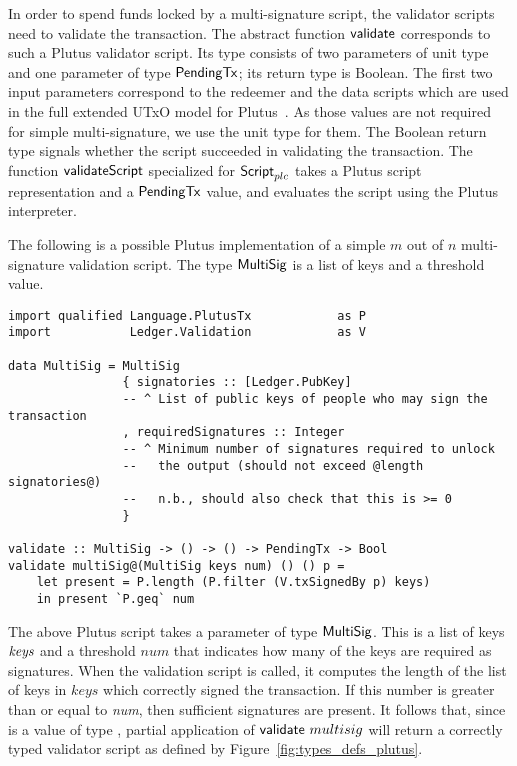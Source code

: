 \documentclass[11pt,a4paper,dvipsnames,twosided]{article}
\newcommand{\Script}{\type{Script}}
\newcommand{\ScriptPlutus}{\Script_{plc}}
\newcommand{\PendingTx}{\type{PendingTx}}
\theoremstyle{definition}
\begin{document}
In order to spend funds locked by a multi-signature script, the validator
scripts need to validate the transaction. The abstract function $\mathsf{validate}$
corresponds to such a Plutus validator script. Its type consists of two
parameters of unit type and one parameter of type $\PendingTx$; its return type
is Boolean. The first two input parameters correspond to the redeemer and the
data scripts which are used in the full extended UTxO model for
Plutus~\cite{chakravarty2020extended}. As those values are not required for simple
multi-signature, we use the unit type for them. The Boolean return type signals
whether the script succeeded in validating the transaction. The function
$\mathsf{validateScript}$ specialized for $\ScriptPlutus$ takes a Plutus script
representation and a $\PendingTx$ value, and evaluates the script using the
Plutus interpreter.

The following is a possible Plutus implementation of a simple $m$ out of $n$
multi-signature validation script. The type $\mathsf{MultiSig}$ is a list of keys
and a threshold value.

\begin{verbatim}
import qualified Language.PlutusTx            as P
import           Ledger.Validation            as V

data MultiSig = MultiSig
                { signatories :: [Ledger.PubKey]
                -- ^ List of public keys of people who may sign the transaction
                , requiredSignatures :: Integer
                -- ^ Minimum number of signatures required to unlock
                --   the output (should not exceed @length signatories@)
                --   n.b., should also check that this is >= 0
                }

validate :: MultiSig -> () -> () -> PendingTx -> Bool
validate multiSig@(MultiSig keys num) () () p =
    let present = P.length (P.filter (V.txSignedBy p) keys)
    in present `P.geq` num
\end{verbatim}

The above Plutus script takes a parameter  of type
$\mathsf{MultiSig}$.  This is a list of keys $\mathit{keys}$ and a threshold $num$
that indicates how many of the keys are required as signatures. When the
validation script is called, it computes the length of the list of keys in $keys$ which correctly signed
the transaction. If this number is greater than or equal to \emph{num},
then sufficient signatures are present. It follows that, since
 is a value of type , partial application of
$\mathsf{validate}~multisig$ will return a correctly typed validator script
as defined by Figure~\ref{fig:types_defs_plutus}.
\end{document}
